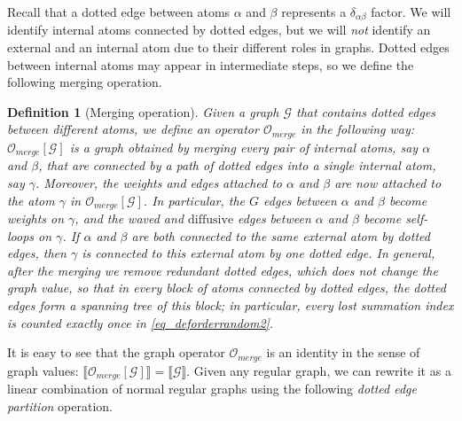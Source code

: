 \documentclass{article}
\newcommand{\1}{\mathds{1}}
\numberwithin{equation}{section}
\newcommand{\al}{\alpha}
\renewcommand{\cal}{\mathcal}
\newcommand{\dashed}{\text{diffusive}}
\theoremstyle{plain} %
\newtheorem{definition}[theorem]{Definition}
\theoremstyle{remark}
\newtheorem{remark}[theorem]{Remark}
\newcommand{\cor}{\color{red}}
\newcommand{\hty}[1]{{\cor (ht: #1) }}
\begin{document}
Recall that a dotted edge between atoms $\al$ and $\beta$ represents a $\delta_{\al\beta}$ factor. We will identify  internal atoms  connected by dotted edges, but we will {\it not} identify an external and an internal atom due to their different roles in graphs. Dotted edges between internal atoms may appear in intermediate steps, so we define the following merging operation. 
\begin{definition}[Merging operation]\label{def merge}
Given a graph $\cal G$ that contains dotted edges between different atoms, we define an operator $\cal O_{merge}$ in the following way: $\cal O_{merge}[\cal G]$ is a graph obtained by merging every pair of internal atoms, say $\al$ and $\beta$, that are connected by a path of dotted edges into a single internal atom, say $\gamma$. Moreover, the weights and edges attached to $\al$ and $\beta$ %
are now attached to the atom $\gamma$ 
 in $\cal O_{merge}[\cal G]$. In particular, the $G$ edges between $\al$ and $\beta$ become weights on $\gamma$, and the waved and $\dashed$ edges between $\al$ and $\beta$ become self-loops on $\gamma$. If $\al$ and $\beta$ are both connected to the same external atom by dotted edges, then $\gamma$ is connected to this external atom by one dotted edge. In general, after the merging we remove redundant dotted edges, which does not change the graph value, so that in every block of atoms connected by dotted edges, the dotted edges form a spanning tree of this block; in particular, every lost summation index is counted exactly once in \eqref{eq_deforderrandom2}.
\end{definition}
It is easy to see that the graph operator $\cal O_{merge}$ is an identity in the sense of graph values:
 $ \llbracket \cal O_{merge}[\cal G]\rrbracket=\llbracket \cal G\rrbracket$.
Given any regular graph, we can rewrite it as a linear combination of normal regular graphs %
using the following \emph{dotted edge partition} operation. 
\end{document}
